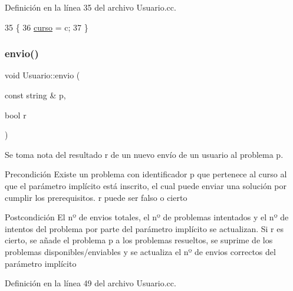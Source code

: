 Definición en la línea 35 del archivo Usuario.\+cc.


\begin{DoxyCode}
35                                          \{
36         \mbox{\hyperlink{class_usuario_aa767fe2d1198f2c97791073bc55803e7}{curso}} = c;
37       \}
\end{DoxyCode}
\mbox{\label{class_usuario_a6c6272b10e0f3795062d39cd9689a9db}} 
\subsubsection{\texorpdfstring{envio()}{envio()}}
{\footnotesize\ttfamily void Usuario\+::envio (\begin{DoxyParamCaption}\item[{const string \&}]{p,  }\item[{bool}]{r }\end{DoxyParamCaption})}



Se toma nota del resultado r de un nuevo envío de un usuario al problema p. 

\begin{DoxyPrecond}{Precondición}
Existe un problema con identificador p que pertenece al curso al que el parámetro implícito está inscrito, el cual puede enviar una solución por cumplir los prerequisitos. r puede ser falso o cierto 
\end{DoxyPrecond}
\begin{DoxyPostcond}{Postcondición}
El nº de envios totales, el nº de problemas intentados y el nº de intentos del problema por parte del parámetro implícito se actualizan. Si r es cierto, se añade el problema p a los problemas resueltos, se suprime de los problemas disponibles/enviables y se actualiza el nº de envios correctos del parámetro implícito 
\end{DoxyPostcond}


Definición en la línea 49 del archivo Usuario.\+cc.


